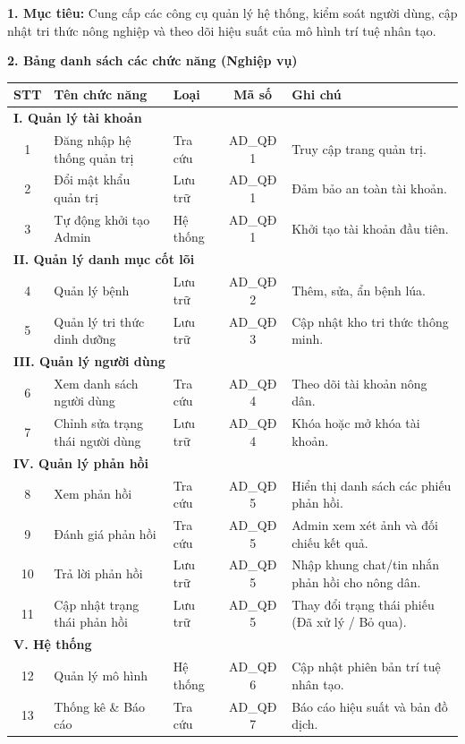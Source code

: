 \documentclass[12pt,a4paper]{article}
\begin{document}
\noindent \textbf{1. Mục tiêu:} Cung cấp các công cụ quản lý hệ thống, kiểm soát người dùng, cập nhật tri thức nông nghiệp và theo dõi hiệu suất của mô hình trí tuệ nhân tạo.

\noindent \textbf{2. Bảng danh sách các chức năng (Nghiệp vụ)}

\begin{longtable}{|c|p{4.5cm}|p{2cm}|c|p{4.5cm}|}
\hline
\rowcolor{headerblue}
\textbf{STT} & \textbf{Tên chức năng} & \textbf{Loại} & \textbf{Mã số} & \textbf{Ghi chú} \\
\hline
\endhead
\multicolumn{5}{|l|}{\cellcolor{notegreen}\textbf{I. Quản lý tài khoản}} \\
\hline
1 & Đăng nhập hệ thống quản trị & Tra cứu & AD\_QĐ 1 & Truy cập trang quản trị. \\
\hline
2 & Đổi mật khẩu quản trị & Lưu trữ & AD\_QĐ 1 & Đảm bảo an toàn tài khoản. \\
\hline
3 & Tự động khởi tạo Admin & Hệ thống & AD\_QĐ 1 & Khởi tạo tài khoản đầu tiên. \\
\hline
\multicolumn{5}{|l|}{\cellcolor{notegreen}\textbf{II. Quản lý danh mục cốt lõi}} \\
\hline
4 & Quản lý bệnh & Lưu trữ & AD\_QĐ 2 & Thêm, sửa, ẩn bệnh lúa. \\
\hline
5 & Quản lý tri thức dinh dưỡng & Lưu trữ & AD\_QĐ 3 & Cập nhật kho tri thức thông minh. \\
\hline
\multicolumn{5}{|l|}{\cellcolor{notegreen}\textbf{III. Quản lý người dùng}} \\
\hline
6 & Xem danh sách người dùng & Tra cứu & AD\_QĐ 4 & Theo dõi tài khoản nông dân. \\
\hline
7 & Chỉnh sửa trạng thái người dùng & Lưu trữ & AD\_QĐ 4 & Khóa hoặc mở khóa tài khoản. \\
\hline
\multicolumn{5}{|l|}{\cellcolor{notegreen}\textbf{IV. Quản lý phản hồi}} \\
\hline
8 & Xem phản hồi & Tra cứu & AD\_QĐ 5 & Hiển thị danh sách các phiếu phản hồi. \\
\hline
9 & Đánh giá phản hồi & Tra cứu & AD\_QĐ 5 & Admin xem xét ảnh và đối chiếu kết quả. \\
\hline
10 & Trả lời phản hồi & Lưu trữ & AD\_QĐ 5 & Nhập khung chat/tin nhắn phản hồi cho nông dân. \\
\hline
11 & Cập nhật trạng thái phản hồi & Lưu trữ & AD\_QĐ 5 & Thay đổi trạng thái phiếu (Đã xử lý / Bỏ qua). \\
\hline
\multicolumn{5}{|l|}{\cellcolor{notegreen}\textbf{V. Hệ thống}} \\
\hline
12 & Quản lý mô hình & Hệ thống & AD\_QĐ 6 & Cập nhật phiên bản trí tuệ nhân tạo. \\
\hline
13 & Thống kê \& Báo cáo & Tra cứu & AD\_QĐ 7 & Báo cáo hiệu suất và bản đồ dịch. \\
\hline
\end{longtable}
\end{document}

